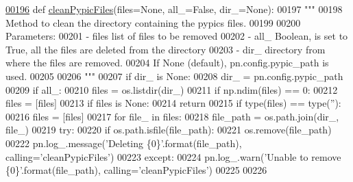\begin{DoxyCode}
\hypertarget{namespacepyneb_1_1utils_1_1misc_l00196}{}\hyperlink{namespacepyneb_1_1utils_1_1misc_a71fea98dc66e2a1793b5c86a345da052}{00196} \textcolor{keyword}{def }\hyperlink{namespacepyneb_1_1utils_1_1misc_a71fea98dc66e2a1793b5c86a345da052}{cleanPypicFiles}(files=None, all\_=False, dir\_=None):
00197     \textcolor{stringliteral}{"""}
00198 \textcolor{stringliteral}{    Method to clean the directory containing the pypics files.}
00199 \textcolor{stringliteral}{}
00200 \textcolor{stringliteral}{    Parameters:}
00201 \textcolor{stringliteral}{        - files    list of files to be removed}
00202 \textcolor{stringliteral}{        - all\_      Boolean, is set to True, all the files are deleted from the directory}
00203 \textcolor{stringliteral}{        - dir\_      directory from where the files are removed. }
00204 \textcolor{stringliteral}{                If None (default), pn.config.pypic\_path is used.}
00205 \textcolor{stringliteral}{}
00206 \textcolor{stringliteral}{    """}
00207     \textcolor{keywordflow}{if} dir\_ \textcolor{keywordflow}{is} \textcolor{keywordtype}{None}:
00208         dir\_ = pn.config.pypic\_path
00209     \textcolor{keywordflow}{if} all\_:
00210         files = os.listdir(dir\_)
00211         \textcolor{keywordflow}{if} np.ndim(files) == 0:
00212             files = [files]
00213     \textcolor{keywordflow}{if} files \textcolor{keywordflow}{is} \textcolor{keywordtype}{None}:
00214         \textcolor{keywordflow}{return}
00215     \textcolor{keywordflow}{if} type(files) == type(\textcolor{stringliteral}{''}):
00216         files = [files]
00217     \textcolor{keywordflow}{for} file\_ \textcolor{keywordflow}{in} files:
00218         file\_path = os.path.join(dir\_, file\_)
00219         \textcolor{keywordflow}{try}:
00220             \textcolor{keywordflow}{if} os.path.isfile(file\_path):
00221                 os.remove(file\_path)
00222                 pn.log\_.message(\textcolor{stringliteral}{'Deleting \{0\}'}.format(file\_path), calling=\textcolor{stringliteral}{'cleanPypicFiles'})
00223         \textcolor{keywordflow}{except}:
00224             pn.log\_.warn(\textcolor{stringliteral}{'Unable to remove \{0\}'}.format(file\_path), calling=\textcolor{stringliteral}{'cleanPypicFiles'})
00225 
00226 
\end{DoxyCode}
\hypertarget{namespacepyneb_1_1utils_1_1misc_a0e9572755930aabb03c6b0e5d66b8356}{}
